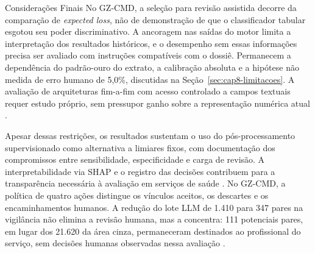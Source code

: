 \begin{chapter}{Considerações Finais}
No GZ-CMD, a seleção para revisão assistida decorre da comparação de \textit{expected loss}, não de demonstração de que o classificador tabular esgotou seu poder discriminativo. A ancoragem nas saídas do motor limita a interpretação dos resultados históricos, e o desempenho sem essas informações precisa ser avaliado com instruções compatíveis com o dossiê. Permanecem a dependência do padrão-ouro do extrato, a calibração absoluta e a hipótese não medida de erro humano de 5,0\%, discutidas na Seção~\ref{sec:cap8-limitacoes}. A avaliação de arquiteturas fim-a-fim com acesso controlado a campos textuais requer estudo próprio, sem pressupor ganho sobre a representação numérica atual \cite{Jardim2026phdrepo}.

Apesar dessas restrições, os resultados sustentam o uso do pós-processamento supervisionado como alternativa a limiares fixos, com documentação dos compromissos entre sensibilidade, especificidade e carga de revisão. A interpretabilidade via SHAP e o registro das decisões contribuem para a transparência necessária à avaliação em serviços de saúde \cite{Markus2021role}. No GZ-CMD, a política de quatro ações distingue os vínculos aceitos, os descartes e os encaminhamentos humanos. A redução do lote LLM de 1.410 para 347 pares na vigilância não elimina a revisão humana, mas a concentra: 111 potenciais pares, em lugar dos 21.620 da área cinza, permaneceram destinados ao profissional do serviço, sem decisões humanas observadas nessa avaliação \cite{Jardim2026phdrepo}.

\end{chapter}
